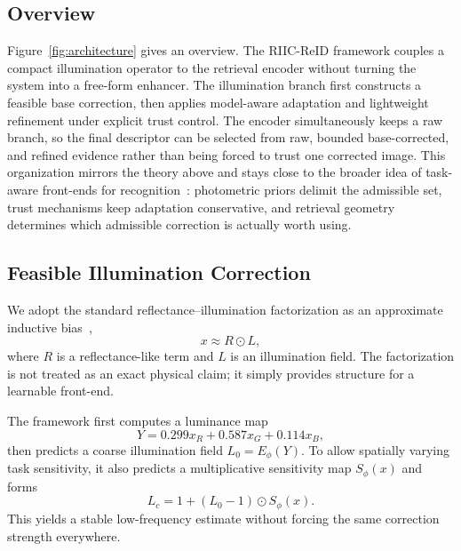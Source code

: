 \documentclass[sigconf,screen,review,anonymous]{acmart}
\begin{document}
\subsection{Overview}
\label{sec:overview}

Figure~\ref{fig:architecture} gives an overview.
The RIIC-ReID framework couples a compact illumination operator to the retrieval encoder without
turning the system into a free-form enhancer.
The illumination branch first constructs a feasible base correction, then
applies model-aware adaptation and lightweight refinement under explicit trust
control.
The encoder simultaneously keeps a raw branch, so the final descriptor can be
selected from raw, bounded base-corrected, and refined evidence rather than
being forced to trust one corrected image.
This organization mirrors the theory above and stays close to the broader
idea of task-aware front-ends for recognition~\cite{liu2022imageadaptive,hashmi2023featenhancer,wu2023semanticaware}:
photometric priors delimit the
admissible set, trust mechanisms keep adaptation conservative, and retrieval
geometry determines which admissible correction is actually worth using.

\subsection{Feasible Illumination Correction}
\label{sec:feasible}

We adopt the standard reflectance--illumination factorization as an approximate
inductive bias~\cite{land1971lightness,land1977retinex,wei2018retinexnet,cai2023retinexformer},
\begin{equation}
  x \approx R \odot L,
\end{equation}
where $R$ is a reflectance-like term and $L$ is an illumination field.
The factorization is not treated as an exact physical claim; it simply provides
structure for a learnable front-end.

The framework first computes a luminance map
\begin{equation}
  Y = 0.299 x_R + 0.587 x_G + 0.114 x_B,
\end{equation}
then predicts a coarse illumination field $L_0 = E_{\phi}(Y)$.
To allow spatially varying task sensitivity, it also predicts a multiplicative
sensitivity map $S_{\phi}(x)$ and forms
\begin{equation}
  L_c = 1 + (L_0 - 1) \odot S_{\phi}(x).
\end{equation}
This yields a stable low-frequency estimate without forcing the same correction
strength everywhere.
\end{document}

